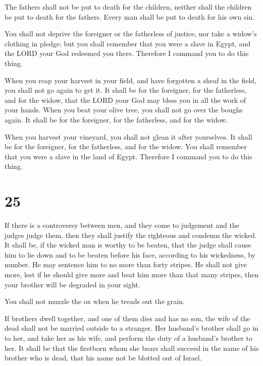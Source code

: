  The fathers shall not be put to death for the children,
neither shall the children be put to death for the fathers. Every man
shall be put to death for his own sin.

 You shall not deprive the foreigner or the fatherless of
justice, nor take a widow's clothing in pledge;  but you
shall remember that you were a slave in Egypt, and the LORD your God
redeemed you there. Therefore I command you to do this thing.

 When you reap your harvest in your field, and have
forgotten a sheaf in the field, you shall not go again to get it. It
shall be for the foreigner, for the fatherless, and for the widow, that
the LORD your God may bless you in all the work of your hands.
 When you beat your olive tree, you shall not go over the
boughs again. It shall be for the foreigner, for the fatherless, and for
the widow.

 When you harvest your vineyard, you shall not glean it
after yourselves. It shall be for the foreigner, for the fatherless, and
for the widow.  You shall remember that you were a slave
in the land of Egypt. Therefore I command you to do this thing.

\hypertarget{section-24}{%
\section{25}\label{section-24}}

 If there is a controversy between men, and they come to
judgement and the judges judge them, then they shall justify the
righteous and condemn the wicked.  It shall be, if the
wicked man is worthy to be beaten, that the judge shall cause him to lie
down and to be beaten before his face, according to his wickedness, by
number.  He may sentence him to no more than forty
stripes. He shall not give more, lest if he should give more and beat
him more than that many stripes, then your brother will be degraded in
your sight.

 You shall not muzzle the ox when he treads out the grain.

 If brothers dwell together, and one of them dies and has
no son, the wife of the dead shall not be married outside to a stranger.
Her husband's brother shall go in to her, and take her as his wife, and
perform the duty of a husband's brother to her.  It shall
be that the firstborn whom she bears shall succeed in the name of his
brother who is dead, that his name not be blotted out of Israel.

